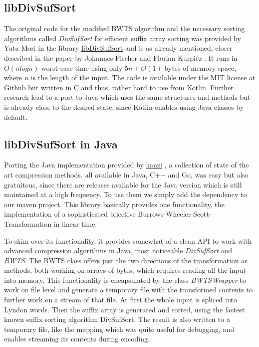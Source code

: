 \subsection{libDivSufSort}
\label{ch:Implementation:sec:Impl:subsec:libs:libDivSufSot}
\par{
The original code for the modified BWTS algorithm and the necessary sorting algorithms called \emph{DivSufSort} for efficient suffix array sorting was provided by Yuta Mori in the library \href{https://github.com/y-256/libdivsufsort}{libDivSufSort} \cite{LibDivSufSort} and is as already mentioned, closer described in the paper by Johannes Fischer and Florian Kurpicz \cite{DBLP:journals/corr/abs-1710-01896}. It  runs in $O(n log n)$ worst-case time using only $5n+O(1)$ bytes of memory space, where $n$ is the length of the input. The code is available under the MIT license at Github but written in C and thus, rather hard to use from Kotlin. Further research lead to a port to Java which uses the same structures and methods but is already close to the desired state, since Kotlin enables using Java classes by default.
}
\subsection{libDivSufSort in Java}
\label{ch:Implementation:sec:Impl:subsec:libs:libDivSufSort Java}
\par{
Porting the Java implementation provided by \href{https://github.com/flanglet/kanzi/releases}{kanzi} \cite{kanzi}, a collection of state of the art compression methods, all available in Java, C++ and Go, was easy but also gratuitous, since there are releases available for the Java version which is still maintained at a high frequency. To use them we simply add the dependency to our maven project. This library basically provides one functionality, the implementation of a sophisticated bijective Burrows-Wheeler-Scott-Transformation in linear time.
}
\par{
To skim over its functionality, it provides somewhat of a clean API to work with advanced compression algorithms in Java, most noticeable \emph{DivSufSort} and \emph{BWTS}. The BWTS class offers just the two directions of the transformation as methods, both working on arrays of bytes, which requires reading all the input into memory. This functionality is encapsulated by the class \emph{BWTSWrapper} to work on file level and generate a temporary file with the transformed contents to further work on a stream of that file. At first the whole input is spliced into Lyndon words. Then the suffix array is generated and sorted, using the fastest known suffix sorting algorithm DivSufSort. The result is also written to a temporary file, like the mapping which was quite useful for debugging, and enables streaming its contents during encoding. 
}

